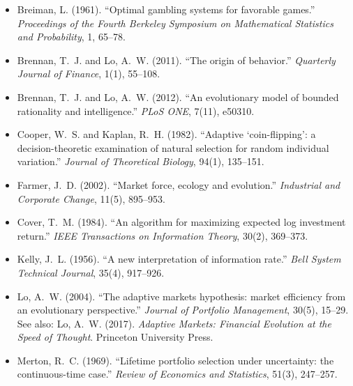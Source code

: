 \documentclass[11pt]{article}
\begin{document}
\begin{itemize}\setlength{\itemsep}{0.4em}

  \item[{[1]}]\hypertarget{ref:1}{} Breiman, L. (1961). ``Optimal gambling systems for
    favorable games.'' \textit{Proceedings of the Fourth Berkeley
    Symposium on Mathematical Statistics and Probability}, 1, 65--78.

  \item[{[2]}]\hypertarget{ref:2}{} Brennan, T.~J. and Lo, A.~W. (2011). ``The origin of
    behavior.'' \textit{Quarterly Journal of Finance}, 1(1), 55--108.

  \item[{[3]}]\hypertarget{ref:3}{} Brennan, T.~J. and Lo, A.~W. (2012). ``An evolutionary
    model of bounded rationality and intelligence.'' \textit{PLoS ONE},
    7(11), e50310.

  \item[{[4]}]\hypertarget{ref:4}{} Cooper, W.~S. and Kaplan, R.~H. (1982). ``Adaptive
    `coin-flipping': a decision-theoretic examination of natural
    selection for random individual variation.'' \textit{Journal of
    Theoretical Biology}, 94(1), 135--151.

  \item[{[5]}]\hypertarget{ref:5}{} Farmer, J.~D. (2002). ``Market force, ecology and
    evolution.'' \textit{Industrial and Corporate Change}, 11(5),
    895--953.

  \item[{[6]}]\hypertarget{ref:6}{} Cover, T.~M. (1984). ``An algorithm for maximizing
    expected log investment return.'' \textit{IEEE Transactions on
    Information Theory}, 30(2), 369--373.

  \item[{[7]}]\hypertarget{ref:7}{} Kelly, J.~L. (1956). ``A new interpretation of
    information rate.'' \textit{Bell System Technical Journal},
    35(4), 917--926.

  \item[{[8]}]\hypertarget{ref:8}{} Lo, A.~W. (2004). ``The adaptive markets hypothesis:
    market efficiency from an evolutionary perspective.''
    \textit{Journal of Portfolio Management}, 30(5), 15--29.
    See also: Lo, A.~W. (2017). \textit{Adaptive Markets: Financial
    Evolution at the Speed of Thought}. Princeton University Press.

  \item[{[9]}]\hypertarget{ref:9}{} Merton, R.~C. (1969). ``Lifetime portfolio selection
    under uncertainty: the continuous-time case.'' \textit{Review of
    Economics and Statistics}, 51(3), 247--257.


\end{itemize}
\end{document}
